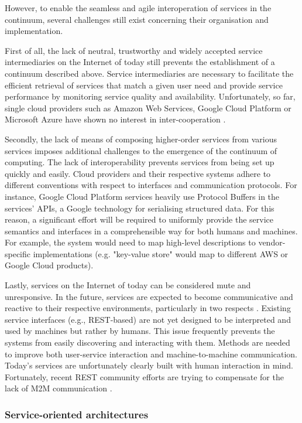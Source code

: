 However, to enable the seamless and agile interoperation of services in the continuum, several challenges still exist concerning their organisation and implementation.

First of all, the lack of neutral, trustworthy and widely accepted service intermediaries on the Internet of today still prevents the establishment of a continuum described above. Service intermediaries are necessary to facilitate the efficient retrieval of services that match a given user need and provide service performance by monitoring service quality and availability. Unfortunately, so far, single cloud providers such as Amazon Web Services, Google Cloud Platform or Microsoft Azure have shown no interest in inter-cooperation \cite{inter-cloud}.

Secondly, the lack of means of composing higher-order services from various services imposes additional challenges to the emergence of the continuum of computing. The lack of interoperability prevents services from being set up quickly and easily. Cloud providers and their respective systems adhere to different conventions with respect to interfaces and communication protocols. For instance, Google Cloud Platform services heavily use Protocol Buffers \cite{protobuf} in the services' APIs, a Google technology for serialising structured data. For this reason, a significant effort will be required to uniformly provide the service semantics and interfaces in a comprehensible way for both humans and machines. For example, the system would need to map high-level descriptions to vendor-specific implementations (e.g. "key-value store" would map to different AWS or Google Cloud products).

Lastly, services on the Internet of today can be considered mute and unresponsive. In the future, services are expected to become communicative and reactive to their respective environments, particularly in two respects \cite{iot-enterprise}. Existing service interfaces (e.g., REST-based) are not yet designed to be interpreted and used by machines but rather by humans. This issue frequently prevents the systems from easily discovering and interacting with them. Methods are needed to improve both user-service interaction and machine-to-machine communication. Today's services are unfortunately clearly built with human interaction in mind.  Fortunately, recent REST community efforts are trying to compensate for the lack of M2M communication \cite{openapi}.

\subsubsection{Service-oriented architectures}

